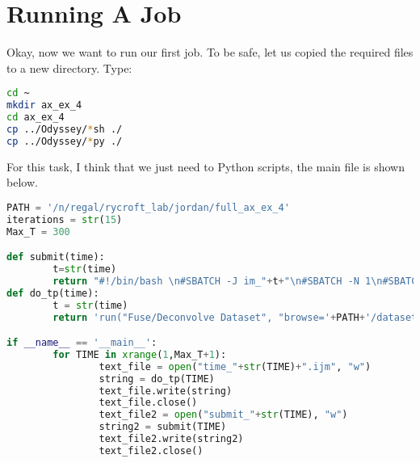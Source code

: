 \documentclass[11pt]{article}
\begin{document}
\section*{Running A Job}
Okay, now we want to run our first job. To be safe, let us copied the required files to a new directory. Type:
\begin{lstlisting}[language=bash, caption=Copy]
cd ~
mkdir ax_ex_4
cd ax_ex_4
cp ../Odyssey/*sh ./
cp ../Odyssey/*py ./
\end{lstlisting}
For this task, I think that we just need to Python scripts, the main file is shown below. 
\begin{lstlisting}[language=Python, caption=\texttt{SETUP\_1.py}]
PATH = '/n/regal/rycroft_lab/jordan/full_ax_ex_4'
iterations = str(15)
Max_T = 300

def submit(time):
        t=str(time)
        return "#!/bin/bash \n#SBATCH -J im_"+t+"\n#SBATCH -N 1\n#SBATCH -n 25\n#SBATCH -t 3-00:00\n#SBATCH -p general\n#SBATCH --mem=100000\n#SBATCH -o out_"+t+".out\n#SBATCH -e err_"+t+".err\nexport DISPLAY=:"+t+"\nXvfb $DISPLAY -auth /dev/null &\n/n/home11/jhoffmann/Fiji/Fiji.app/ImageJ-linux64 --memory=100000m -macro ./time_"+t+".ijm"
def do_tp(time):
        t = str(time)
        return 'run("Fuse/Deconvolve Dataset", "browse='+PATH+'/dataset.xml select_xml='+PATH+'/dataset.xml process_angle=[All angles] process_channel=[Single channel (Select from List)] process_illumination=[All illuminations] process_timepoint=[Single Timepoint (Select from List)] processing_channel=[channel 1] processing_timepoint=[Timepoint '+t+'] type_of_image_fusion=[Multi-view deconvolution] bounding_box=[Define manually] fused_image=[Save as TIFF stack] minimal_x=130 minimal_y=30 minimal_z=-65 maximal_x=780 maximal_y=1860 maximal_z=600 imglib2_container=[CellImg (large images)] imglib2_container_ffts=ArrayImg save_memory type_of_iteration=[Efficient Bayesian - Optimization I (fast, precise)] image_weights=[Virtual weights (less memory, slower)] osem_acceleration=[1 (balanced)] number_of_iterations='+iterations+' use_tikhonov_regularization tikhonov_parameter=0.0060 compute=[Entire image at once] compute_on=[CPU (Java)] psf_estimation=[Provide file with PSF] psf_display=[Do not show PSFs] output_file_directory='+PATH+'/decon_15/ use_same_psf_for_all_angles/illuminations browse=['+PATH+'/psf.tif] transform_psfs psf_file=['+PATH+'/psf.tif]");'

if __name__ == '__main__':
        for TIME in xrange(1,Max_T+1):
                text_file = open("time_"+str(TIME)+".ijm", "w")
                string = do_tp(TIME)
                text_file.write(string)
                text_file.close()
                text_file2 = open("submit_"+str(TIME), "w")
                string2 = submit(TIME)
                text_file2.write(string2)
                text_file2.close()


\end{lstlisting}
\end{document}
